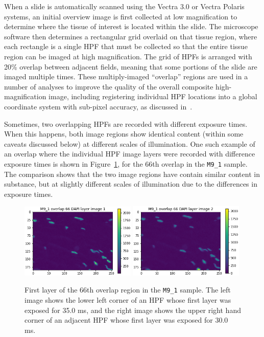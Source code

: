 \documentclass[letterpaper,11pt]{article}
\newcommand{\reffig}[1]{Figure~\ref{#1}}
\begin{document}
When a slide is automatically scanned using the Vectra 3.0 or Vectra Polaris systems, an initial overview image is first collected at low magnification to determine where the tissue of interest is located within the slide. The microscope software then determines a rectangular grid overlaid on that tissue region, where each rectangle is a single HPF that must be collected so that the entire tissue region can be imaged at high magnification. The grid of HPFs is arranged with 20\% overlap between adjacent fields, meaning that some portions of the slide are imaged multiple times. These multiply-imaged ``overlap'' regions are used in a number of analyses to improve the quality of the overall composite high-magnification image, including registering individual HPF locations into a global coordinate system with sub-pixel accuracy, as discussed in~\cite{Heshy}.

Sometimes, two overlapping HPFs are recorded with different exposure times. When this happens, both image regions show identical content (within some caveats discussed below) at different scales of illumination. One such example of an overlap where the individual HPF image layers were recorded with difference exposure times is shown in \reffig{fig:raw_M9_1_overlap_66}, for the 66th overlap in the \texttt{M9\_1} sample. The comparison shows that the two image regions have contain similar content in substance, but at slightly different scales of illumination due to the differences in exposure times. 

\begin{figure}[!ht]
\centering
\includegraphics[width=0.49\textwidth]{images/methods/raw_M9_1_overlap_66_dapi_image_1}
\includegraphics[width=0.49\textwidth]{images/methods/raw_M9_1_overlap_66_dapi_image_2}
\caption{\footnotesize First layer of the 66th overlap region in the \texttt{M9\_1} sample. The left image shows the lower left corner of an HPF whose first layer was exposed for 35.0 ms, and the right image shows the upper right hand corner of an adjacent HPF whose first layer was exposed for 30.0 ms.}
\label{fig:raw_M9_1_overlap_66}
\end{figure}
\end{document}
